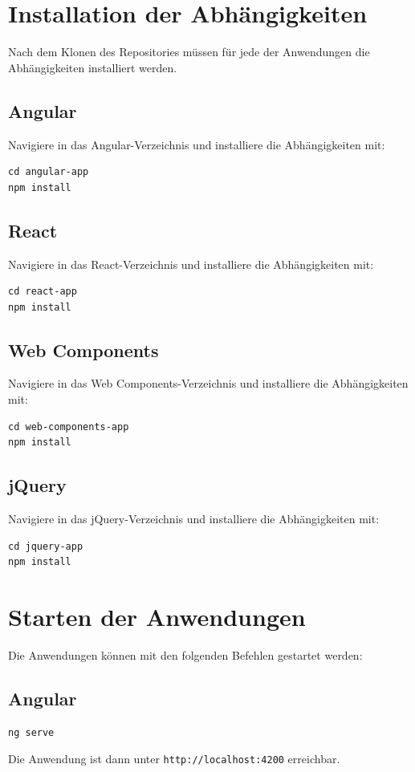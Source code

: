 \documentclass[oneside]{ausarbeitung}
\begin{document}
\section{Installation der Abhängigkeiten}
Nach dem Klonen des Repositories müssen für jede der Anwendungen die Abhängigkeiten installiert werden. 

\subsection{Angular}
Navigiere in das Angular-Verzeichnis und installiere die Abhängigkeiten mit:
\begin{verbatim}
cd angular-app
npm install
\end{verbatim}

\subsection{React}
Navigiere in das React-Verzeichnis und installiere die Abhängigkeiten mit:
\begin{verbatim}
cd react-app
npm install
\end{verbatim}

\subsection{Web Components}
Navigiere in das Web Components-Verzeichnis und installiere die Abhängigkeiten mit:
\begin{verbatim}
cd web-components-app
npm install
\end{verbatim}

\subsection{jQuery}
Navigiere in das jQuery-Verzeichnis und installiere die Abhängigkeiten mit:
\begin{verbatim}
cd jquery-app
npm install
\end{verbatim}

\section{Starten der Anwendungen}
Die Anwendungen können mit den folgenden Befehlen gestartet werden:

\subsection{Angular}
\begin{verbatim}
ng serve
\end{verbatim}
Die Anwendung ist dann unter \texttt{http://localhost:4200} erreichbar.
\end{document}
